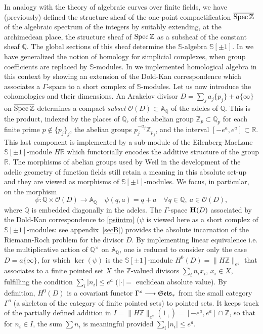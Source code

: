 \documentclass[cupthm]{CUP-JNL-JMJ}
\numberwithin{equation}{section}
\theoremstyle{cupplain}
\theoremstyle{cupdefinition}
\theoremstyle{cupremark}
\theoremstyle{cupproof}
\def\A{{\mathbb A}}
\def\Q{{\mathbb Q}}
\def\R{{\mathbb R}}
\def\S{{\mathbb S}}
\def\Z{{\mathbb Z}}
\def\cO{{\mathcal O}}
\def\bfh{{\bf H}}
\def\Spec{{\rm Spec\,}}
\def\sss{{\S}}
\def\spm{{\sss[\pm 1]}}
\def\Se{\frak{ Sets}}
\def\spzb{{\overline{\Spec\Z}}}
\begin{document}
In analogy with the theory of algebraic curves  over finite fields, we
 have (previously) defined the structure sheaf of the one-point  compactification $\spzb$ of the algebraic spectrum of the integers   by suitably extending, at the archimedean place, the structure sheaf of ${\Spec\Z}$ as a subsheaf of the constant sheaf $\Q$. The  global sections of this sheaf determine the $\sss$-algebra  $\spm$. In  \cite{CCgromov} we have generalized the notion of homology for simplicial complexes, when group coefficients are replaced by $\sss$-modules. In \cite{CCAtiyah} we implemented homological algebra in this context by showing an extension  of the Dold-Kan correspondence which associates a $\Gamma$-space to a short complex of $\sss$-modules.\newline
  Let us now introduce  the cohomologies and their dimensions.
  An Arakelov divisor $D=\sum_j a_j\{p_j\} + a\{\infty\}$ on $\spzb$ determines a compact \emph{subset} $\cO(D)\subset \A_\Q$ of the adeles of $\Q$. This is  the product, indexed by the places of $\Q$, of the abelian group $\Z_p\subset \Q_p$ for each finite prime  $p\notin \{p_j\}_j$, the  abelian groups  $p_j^{-a_j}\Z_{p_j}$, and the interval $[-e^a,e^a]\subset \R$. This last component is implemented by a sub-module of the Eilenberg-MacLane $\spm$-module $H\R$  which functorially encodes the additive structure of the group $\R$. The morphisms of abelian groups used by Weil in the development of the adelic geometry of function fields still retain a meaning in this absolute set-up and they are viewed as  morphisms of $\spm$-modules. We  focus, in particular, on the morphism
 \begin{equation}\label{psiintro}
 \psi: \Q\times \cO(D) \to \A_\Q\quad \psi(q,a) = q+ a\quad \forall q\in \Q,~a\in \cO(D),
 \end{equation}
 where $\Q$ is embedded diagonally  in the adeles. The $\Gamma$-space $\bfh(D)$   associated by the Dold-Kan correspondence to \eqref{psiintro} ($\psi$ is viewed here as a short complex of $\spm$-modules: see appendix~\ref{secB}) provides the absolute incarnation of the Riemann-Roch problem for the divisor $D$. By implementing linear equivalence i.e. the multiplicative action of $\Q^\times$  on $\A_\Q$, one is reduced to consider only the case   $D=a\{\infty\}$, for which  $\ker(\psi)$ is   the $\spm$-module $H^0(D)=\| H\Z\|_{e^a}$ that associates to a finite pointed set $X$ the $\Z$-valued  divisors $\sum_i n_ix_i$, $x_i\in X$,  fulfilling the condition  $\sum_i \vert n_i\vert\leq e^a$ ($\vert\cdot\vert=$  euclidean absolute value).  By definition, $H^0(D)$ is a covariant functor $\Gamma^{o}\longrightarrow \Se_*$ from the small category $\Gamma^{o}$ (a skeleton of the category of finite pointed sets) to pointed sets. It  keeps track of the partially defined addition in $I=\| H\Z\|_{e^a}(1_+)=[-e^a,e^a]\cap \Z$, so that for $n_i\in I$, the sum $\sum n_i$ is meaningful provided  $\sum_i \vert n_i\vert \leq e^a$.
\end{document}
